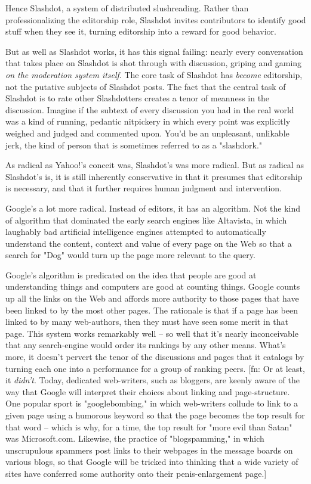 Hence Slashdot, a system of distributed slushreading. Rather than
professionalizing the editorship role, Slashdot invites
contributors to identify good stuff when they see it, turning
editorship into a reward for good behavior.

But as well as Slashdot works, it has this signal failing: nearly
every conversation that takes place on Slashdot is shot through
with discussion, griping and gaming
\emph{on the moderation system itself}. The core task of Slashdot
has \emph{become} editorship, not the putative subjects of
Slashdot posts. The fact that the central task of Slashdot is to
rate other Slashdotters creates a tenor of meanness in the
discussion. Imagine if the subtext of every discussion you had in
the real world was a kind of running, pedantic nitpickery in which
every point was explicitly weighed and judged and commented upon.
You'd be an unpleasant, unlikable jerk, the kind of person that is
sometimes referred to as a "slashdork."

As radical as Yahoo!'s conceit was, Slashdot's was more radical.
But as radical as Slashdot's is, it is still inherently
conservative in that it presumes that editorship is necessary, and
that it further requires human judgment and intervention.

Google's a lot more radical. Instead of editors, it has an
algorithm. Not the kind of algorithm that dominated the early
search engines like Altavista, in which laughably bad artificial
intelligence engines attempted to automatically understand the
content, context and value of every page on the Web so that a
search for "Dog" would turn up the page more relevant to the
query.

Google's algorithm is predicated on the idea that people are good
at understanding things and computers are good at counting things.
Google counts up all the links on the Web and affords more
authority to those pages that have been linked to by the most other
pages. The rationale is that if a page has been linked to by many
web-authors, then they must have seen some merit in that page. This
system works remarkably well -- so well that it's nearly
inconceivable that any search-engine would order its rankings by
any other means. What's more, it doesn't pervert the tenor of the
discussions and pages that it catalogs by turning each one into a
performance for a group of ranking peers. [fn: Or at least, it
\emph{didn't}. Today, dedicated web-writers, such as bloggers,
are keenly aware of the way that Google will interpret their
choices about linking and page-structure. One popular sport is
"googlebombing," in which web-writers collude to link to a given
page using a humorous keyword so that the page becomes the top
result for that word -- which is why, for a time, the top result
for "more evil than Satan" was Microsoft.com. Likewise, the
practice of "blogspamming," in which unscrupulous spammers post
links to their webpages in the message boards on various blogs, so
that Google will be tricked into thinking that a wide variety of
sites have conferred some authority onto their penis-enlargement
page.]

